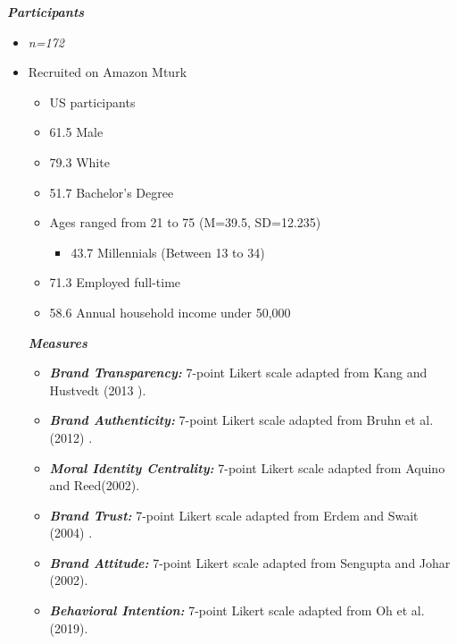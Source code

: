 \documentclass[a0,portrait]{a0poster}
\begin{document}
\begin{minipage}[c]{\linewidth}
\begin{framed}
\begin{multicols}{2}
\color{Maroon}
\textbf{\emph{Participants}}
\color{Black}
\begin{itemize}
\item \textit{n=172}
\item Recruited on Amazon Mturk
\begin{itemize}
    \item US participants 
    \item 61.5\text{\%} Male
    \item 79.3\text{\%} White
    \item 51.7\text{\%} Bachelor's Degree
    \item Ages ranged from 21 to 75 (M=39.5, SD=12.235)
    \begin{itemize}
        \item 43.7\text{\%} Millennials (Between 13 to 34)
    \end{itemize}
    \item 71.3\text{\%} Employed full-time
    \item 58.6\text{\%} Annual household income under \text{\$}50,000
\end{itemize}
\color{Maroon}
\textbf{\emph{Measures}}
\color{Black}


\begin{itemize} \item 
\textbf{\emph{Brand Transparency:}} 7-point Likert scale adapted from Kang and Hustvedt (2013 \autocite{kang_building_2013}).
\end{itemize}
\begin{itemize}
    \item \textbf{\emph{Brand Authenticity:}} 7-point Likert scale adapted from Bruhn et al.(2012) \autocite{bruhn_brand_2012}.
\end{itemize}
\begin{itemize} \item
\textbf{\emph{Moral Identity Centrality:}} 7-point Likert scale adapted from Aquino and Reed(2002).
\end{itemize}
\begin{itemize} \item
\textbf{\emph{Brand Trust:}} 7-point Likert scale adapted from Erdem and Swait (2004) \autocite{Erdem_Swait_2004}.
\end{itemize}
\begin{itemize} \item
\textbf{\emph{Brand Attitude:}} 7-point Likert scale adapted from Sengupta and Johar (2002). \autocite{Sengupta_Johar_2002}
\end{itemize}
\begin{itemize} \item
\textbf{\emph{Behavioral Intention:}} 7-point Likert scale adapted from Oh et al. (2019). \autocite{Oh_Prado_Korelo_Frizzo_2019}
\end{itemize}
\end{itemize}


\end{multicols}
\end{framed}
\end{minipage}
\end{document}
